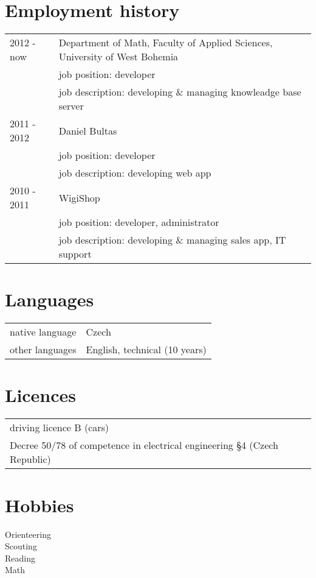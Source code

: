 \documentclass[12pt,a4paper]{article}
\begin{document}
\section*{Employment history}
\begin{tabular}{@{}p{2cm}l}
2012 - now & Department of Math, Faculty of Applied Sciences, University of West Bohemia \\
 & job position: developer\\
 & job description: developing \& managing knowleadge base server\\
2011 - 2012 & Daniel Bultas\\
 & job position: developer\\
 & job description: developing web app\\
2010 - 2011 & WigiShop\\
 & job position: developer, administrator\\
 & job description: developing \& managing sales app, IT support\\
\end{tabular}

\section*{Languages}
\begin{tabular}{@{}p{4cm}l}
native language & Czech\\
other languages & English, technical (10 years)\\
\end{tabular}

\section*{Licences}
\begin{tabular}{@{}l}
driving licence  B (cars)\\
Decree 50/78 of competence in electrical engineering §4 (Czech Republic)\\
\end{tabular}

\section*{Hobbies}
Orienteering\\
Scouting\\
Reading\\
Math\\
\end{document}
